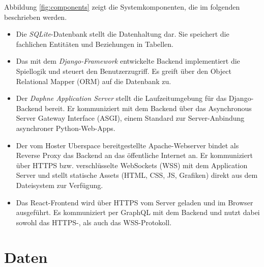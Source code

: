 \documentclass[a4paper,11pt,listof=numbered,glossary=totoc,parskip=half,toc=bib]{scrreprt}
\begin{document}
	Abbildung \ref{fig:components} zeigt die Systemkomponenten, die im folgenden beschrieben werden.
	
	\begin{itemize}
		\item Die \textit{SQLite}-Datenbank stellt die Datenhaltung dar. Sie speichert die fachlichen Entitäten und Beziehungen in Tabellen.
		\item Das mit dem \textit{Django-Framework} entwickelte Backend implementiert die Spiellogik und steuert den Benutzerzugriff. Es greift über den Object Relational Mapper (ORM) auf die Datenbank zu.
		\item Der \textit{Daphne Application Server} stellt die Laufzeitumgebung für das Django-Backend bereit. Er kommuniziert mit dem Backend über das Asynchronous Server Gateway Interface (ASGI), einem Standard zur Server-Anbindung asynchroner Python-Web-Apps.
		\item Der vom Hoster Uberspace bereitgestellte Apache-Webserver bindet als Reverse Proxy das Backend an das öffentliche Internet an. Er kommuniziert über HTTPS bzw. verschlüsselte WebSockets (WSS) mit dem Application Server und stellt statische Assets (HTML, CSS, JS, Grafiken) direkt aus dem Dateisystem zur Verfügung.
		\item Das React-Frontend wird über HTTPS vom Server geladen und im Browser ausgeführt. Es kommuniziert per GraphQL mit dem Backend und nutzt dabei sowohl das HTTPS-, als auch das WSS-Protokoll.
	\end{itemize}
	
	
	\section{Daten}
	
\end{document}
